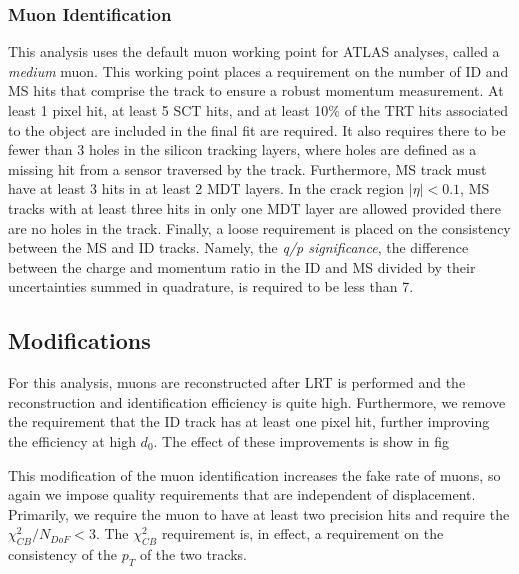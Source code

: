 
\subsubsection{Muon Identification}

This analysis uses the default muon working point for ATLAS analyses, called a \emph{medium} muon. This working point places a requirement on the number of \ac{ID} and \ac{MS} hits that comprise the track to ensure a robust momentum measurement. At least 1 pixel hit, at least 5 \ac{SCT} hits, and at least 10\% of the \ac{TRT} hits associated to the object are included in the final fit are required. It also requires there to be fewer than 3 holes in the silicon tracking layers, where holes are defined as a missing hit from a sensor traversed by the track. Furthermore, \ac{MS} track must have at least 3 hits in at least 2 \ac{MDT} layers. In the crack region $|\eta| < 0.1$, \ac{MS} tracks with at least three hits in only one \ac{MDT} layer are allowed provided there are no holes in the track. Finally, a loose requirement is placed on the consistency between the \ac{MS} and \ac{ID} tracks. Namely, the \emph{q/p significance}, the difference between the charge and momentum ratio in the \ac{ID} and \ac{MS} divided by their uncertainties summed in quadrature, is required to be less than 7. 



\subsection{Modifications}

For this analysis, muons are reconstructed after \ac{LRT} is performed and the reconstruction and identification efficiency is quite high. Furthermore, we remove the requirement that the \ac{ID} track has at least one pixel hit, further improving the efficiency at high $d_{0}$. The effect of these improvements is show in fig %


This modification of the muon identification increases the fake rate of muons, so again we impose quality requirements that are independent of displacement. Primarily, we require the muon to have at least two precision hits and require the $\chi^{2}_{CB}/N_{DoF} < 3$. The $\chi^{2}_{CB}$ requirement is, in effect, a requirement on the consistency of the $p_{T}$ of the two tracks. 



